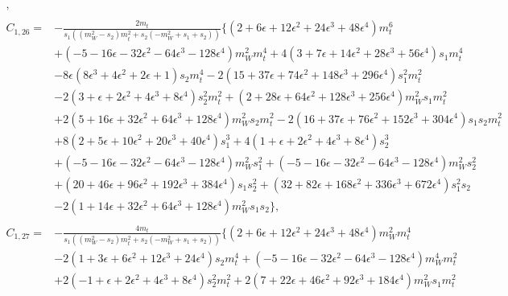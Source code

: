 \documentclass[twocolumn,aps,showpacs,nofootinbib,superscriptaddress,prd]{revtex4-2}
\begin{document}
\begin{widetext}
\begin{align}
,\nonumber\\
\nonumber\\
C_{1,26}=&-\frac{2m_t}{s_1\left(\left(m_W^2-s_2\right)m_t^2+s_2\left(-m_W^2+s_1+s_2\right)\right)}\{\left(2 +6 \epsilon +12 \epsilon^2 +24 \epsilon^3 +48 \epsilon^4\right)m_t^6
\nonumber\\&
+\left(-5 -16 \epsilon -32 \epsilon^2 -64 \epsilon^3 -128 \epsilon^4\right)m_W^2m_t^4+4\left(3 +7 \epsilon +14 \epsilon^2 +28 \epsilon^3 +56 \epsilon^4\right)s_1m_t^4
\nonumber\\&
-8\epsilon\left(8\epsilon^3+4\epsilon^2+2\epsilon+1\right)s_2m_t^4-2\left(15 +37 \epsilon +74 \epsilon^2 +148 \epsilon^3 +296 \epsilon^4\right)s_1^2m_t^2
\nonumber\\&
-2\left(3 +\epsilon +2 \epsilon^2 +4 \epsilon^3 +8 \epsilon^4\right)s_2^2m_t^2+\left(2 +28 \epsilon +64 \epsilon^2 +128 \epsilon^3 +256 \epsilon^4\right)m_W^2s_1m_t^2
\nonumber\\&
+2\left(5 +16 \epsilon +32 \epsilon^2 +64 \epsilon^3 +128 \epsilon^4\right)m_W^2s_2m_t^2-2\left(16 +37 \epsilon +76 \epsilon^2 +152 \epsilon^3 +304 \epsilon^4\right)s_1s_2m_t^2
\nonumber\\&
+8\left(2 +5 \epsilon +10 \epsilon^2 +20 \epsilon^3 +40 \epsilon^4\right)s_1^3+4\left(1 +\epsilon +2 \epsilon^2 +4 \epsilon^3 +8 \epsilon^4\right)s_2^3
\nonumber\\&
+\left(-5 -16 \epsilon -32 \epsilon^2 -64 \epsilon^3 -128 \epsilon^4\right)m_W^2s_1^2+\left(-5 -16 \epsilon -32 \epsilon^2 -64 \epsilon^3 -128 \epsilon^4\right)m_W^2s_2^2
\nonumber\\&
+\left(20 +46 \epsilon +96 \epsilon^2 +192 \epsilon^3 +384 \epsilon^4\right)s_1s_2^2+\left(32 +82 \epsilon +168 \epsilon^2 +336 \epsilon^3 +672 \epsilon^4\right)s_1^2s_2
\nonumber\\&
-2\left(1 +14 \epsilon +32 \epsilon^2 +64 \epsilon^3 +128 \epsilon^4\right)m_W^2s_1s_2\}
,\nonumber\\
\nonumber\\
C_{1,27}=&-\frac{4m_t}{s_1\left(\left(m_W^2-s_2\right)m_t^2+s_2\left(-m_W^2+s_1+s_2\right)\right)}\{\left(2 +6 \epsilon +12 \epsilon^2 +24 \epsilon^3 +48 \epsilon^4\right)m_W^2m_t^4
\nonumber\\&
-2\left(1 +3 \epsilon +6 \epsilon^2 +12 \epsilon^3 +24 \epsilon^4\right)s_2m_t^4+\left(-5 -16 \epsilon -32 \epsilon^2 -64 \epsilon^3 -128 \epsilon^4\right)m_W^4m_t^2
\nonumber\\&
+2\left(-1 +\epsilon +2 \epsilon^2 +4 \epsilon^3 +8 \epsilon^4\right)s_2^2m_t^2+2\left(7 +22 \epsilon +46 \epsilon^2 +92 \epsilon^3 +184 \epsilon^4\right)m_W^2s_1m_t^2

\end{align}
\end{widetext}
\end{document}
